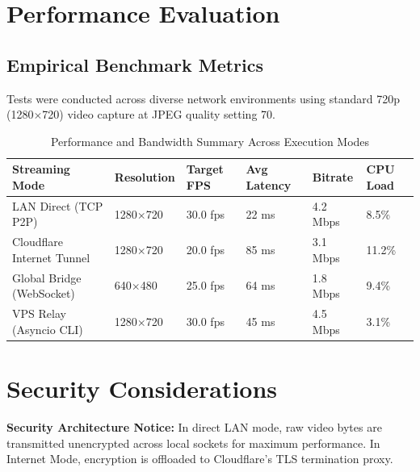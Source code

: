 \documentclass[11pt,a4paper]{article}
\begin{document}
\newpage

\section{Performance Evaluation}

\subsection{Empirical Benchmark Metrics}
Tests were conducted across diverse network environments using standard 720p (1280$\times$720) video capture at JPEG quality setting 70.

\begin{table}[H]
    \centering
    \begin{tabular}{@{}llllll@{}}
        \toprule
        \textbf{Streaming Mode} & \textbf{Resolution} & \textbf{Target FPS} & \textbf{Avg Latency} & \textbf{Bitrate} & \textbf{CPU Load} \\
        \midrule
        LAN Direct (TCP P2P) & 1280$\times$720 & 30.0 fps & 22 ms & 4.2 Mbps & 8.5\% \\
        Cloudflare Internet Tunnel & 1280$\times$720 & 20.0 fps & 85 ms & 3.1 Mbps & 11.2\% \\
        Global Bridge (WebSocket) & 640$\times$480 & 25.0 fps & 64 ms & 1.8 Mbps & 9.4\% \\
        VPS Relay (Asyncio CLI) & 1280$\times$720 & 30.0 fps & 45 ms & 4.5 Mbps & 3.1\% \\
        \bottomrule
    \end{tabular}
    \caption{Performance and Bandwidth Summary Across Execution Modes}
\end{table}



\newpage

\section{Security Considerations}

\begin{alertbox}
    \textbf{Security Architecture Notice:} In direct LAN mode, raw video bytes are transmitted unencrypted across local sockets for maximum performance. In Internet Mode, encryption is offloaded to Cloudflare's TLS termination proxy.
\end{alertbox}
\end{document}
